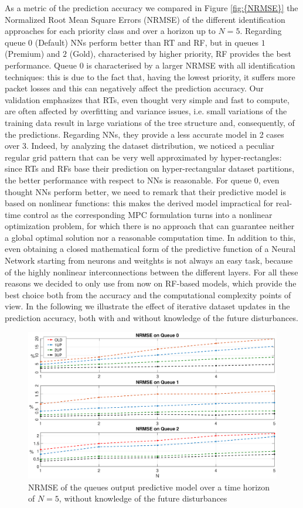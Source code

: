 As a metric of the prediction accuracy we compared in Figure \ref{fig:{NRMSE}} the Normalized Root Mean Square Errors (NRMSE) of the different identification approaches for each priority class and over a horizon up to $N=5$. Regarding queue $0$ (Default) NNs perform better than RT and RF, but in queues $1$ (Premium) and $2$ (Gold), characterised by higher priority, RF provides the best performance. Queue $0$ is characterised by a larger NRMSE with all identification techniques: this is due to the fact that, having the lowest priority, it suffers more packet losses and this can negatively affect the prediction accuracy. Our validation emphasizes that RTs, even thought very simple and fast to compute, are often affected by overfitting and variance issues, i.e. small variations of the training data result in large variations of the tree structure and, consequently, of the predictions. Regarding NNs, they provide a less accurate model in 2 cases over 3. Indeed, by analyzing the dataset distribution, we noticed a peculiar regular grid pattern that can be very well approximated by hyper-rectangles: since RTs and RFs base their prediction on hyper-rectangular dataset partitions, the better performance with respect to NNs is reasonable. For queue 0, even thought NNs perform better, we need to remark that their predictive model is based on nonlinear functions: this makes the derived model impractical for real-time control as the corresponding MPC formulation turns into a nonlinear optimization problem, for which there is no approach that can guarantee neither a global optimal solution nor a reasonable computation time. In addition to this, even obtaining a closed mathematical form of the predictive function of a Neural Network starting from neurons and weitghts is not always an easy task, because of the highly nonlinear interconnections between the different layers. For all these reasons we decided to only use from now on RF-based models, which provide the best choice both from the accuracy and the computational complexity points of view. In the following we illustrate the effect of iterative dataset updates in the prediction accuracy, both with and without knowledge of the future disturbances.
\begin{figure}[th!]
	\centering
	\includegraphics[trim={120 0 120 0}, width=0.9\linewidth]{figure/Error_State.eps}
	\caption{NRMSE of the queues output predictive model over a time horizon of $N=5$, without knowledge of the future disturbances}
	\label{fig:{stateNRMSE}}
\end{figure}
